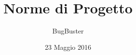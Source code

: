 



\title{\textbf{Norme di Progetto}}
\author{BugBuster}

\date{23 Maggio 2016}




\makeFrontPage

\tableofcontents





